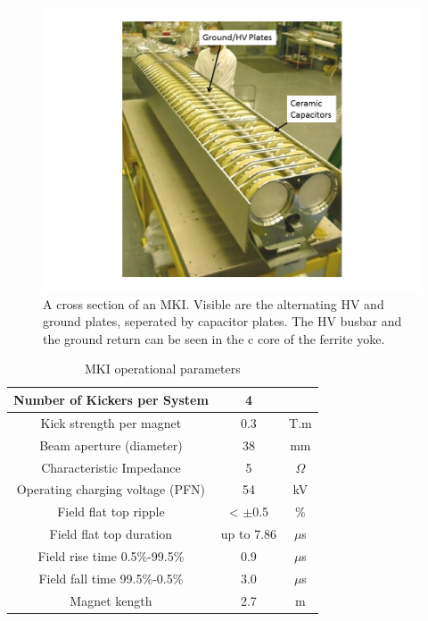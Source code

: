 \begin{figure}
\begin{center}
\includegraphics[height=0.4\textwidth]{LHC_MKI/figures/mki-out-vac-tank.png}
\end{center}
\caption{A cross section of an MKI. Visible are the alternating HV and ground plates, seperated by capacitor plates. The HV busbar and the ground return can be seen in the c core of the ferrite yoke.}
\label{fig:lhc-mki-cross-section}
\end{figure}

\begin{table}
\caption{MKI operational parameters}

\begin{center}
\begin{tabular}{c | c | c}
Number of Kickers per System & 4 & \\ \hline
Kick strength per magnet & 0.3 & T.m \\ \hline
Beam aperture (diameter) & 38 & mm \\ \hline
Characteristic Impedance & 5 & $\Omega$ \\ \hline
Operating charging voltage (PFN) & 54 & kV \\ \hline
Field flat top ripple & < $\pm$0.5 & \% \\ \hline
Field flat top duration & up to 7.86 & $\mu$s \\ \hline
Field rise time 0.5\%-99.5\% & 0.9 & $\mu$s \\ \hline
Field fall time 99.5\%-0.5\% & 3.0 & $\mu$s \\ \hline
Magnet kength & 2.7 & m \\ 
\end{tabular}
\end{center}
\label{tab:mki-parameters}
\end{table}